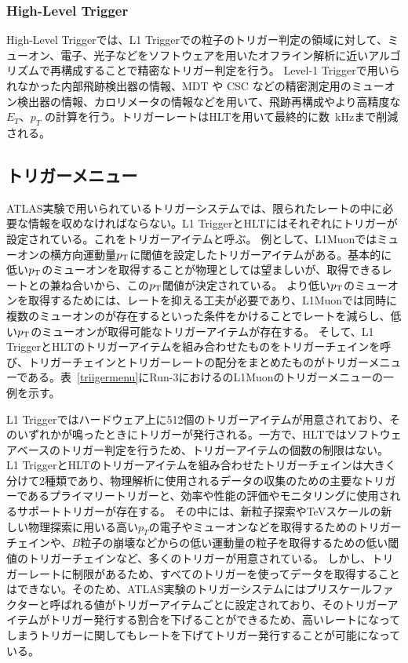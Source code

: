 \subsubsection{High-Level Trigger}
High-Level Triggerでは、L1 Triggerでの粒子のトリガー判定の領域に対して、ミューオン、電子、光子などをソフトウェアを用いたオフライン解析に近いアルゴリズムで再構成することで精密なトリガー判定を行う。
Level-1 Triggerで用いられなかった内部飛跡検出器の情報、MDT や CSC などの精密測定用のミューオン検出器の情報、カロリメータの情報などを用いて、飛跡再構成やより高精度な $E_T$、$p_T$ の計算を行う。トリガーレートはHLTを用いて最終的に数~kHzまで削減される。

\subsection{トリガーメニュー}
ATLAS実験で用いられているトリガーシステムでは、限られたレートの中に必要な情報を収めなければならない。L1 TriggerとHLTにはそれぞれにトリガーが設定されている。これをトリガーアイテムと呼ぶ。
例として、L1Muonではミューオンの横方向運動量$p_{\rm{T}}$に閾値を設定したトリガーアイテムがある。基本的に低い$p_{\rm{T}}$のミューオンを取得することが物理としては望ましいが、取得できるレートとの兼ね合いから、この$p_{\rm{T}}$閾値が決定されている。
より低い$p_{\rm{T}}$のミューオンを取得するためには、レートを抑える工夫が必要であり、L1Muonでは同時に複数のミューオンのが存在するといった条件をかけることでレートを減らし、低い$p_{\rm{T}}$のミューオンが取得可能なトリガーアイテムが存在する。
そして、L1 TriggerとHLTのトリガーアイテムを組み合わせたものをトリガーチェインを呼び、トリガーチェインとトリガーレートの配分をまとめたものがトリガーメニューである。表~\ref{triigermenu}にRun-3におけるのL1Muonのトリガーメニューの一例を示す。

L1 Triggerではハードウェア上に512個のトリガーアイテムが用意されており、そのいずれかが鳴ったときにトリガーが発行される。一方で、HLTではソフトウェアベースのトリガー判定を行うため、トリガーアイテムの個数の制限はない。
L1 TriggerとHLTのトリガーアイテムを組み合わせたトリガーチェインは大きく分けて2種類であり、物理解析に使用されるデータの収集のための主要なトリガーであるプライマリートリガーと、効率や性能の評価やモニタリングに使用されるサポートトリガーが存在する。
その中には、新粒子探索やTeVスケールの新しい物理探索に用いる高い$p_T$の電子やミューオンなどを取得するためのトリガーチェインや、$B$粒子の崩壊などからの低い運動量の粒子を取得するための低い閾値のトリガーチェインなど、多くのトリガーが用意されている。
しかし、トリガーレートに制限があるため、すべてのトリガーを使ってデータを取得することはできない。そのため、ATLAS実験のトリガーシステムにはプリスケールファクターと呼ばれる値がトリガーアイテムごとに設定されており、そのトリガーアイテムがトリガー発行する割合を下げることができるため、高いレートになってしまうトリガーに関してもレートを下げてトリガー発行することが可能になっている。


